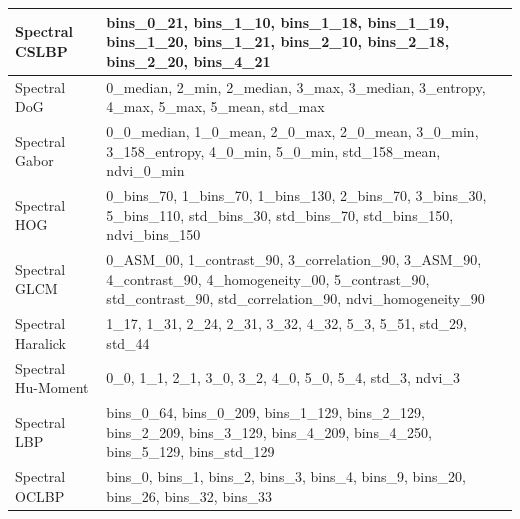 \documentclass[../thesis.tex]{subfiles}
\begin{document}
    \vfill
    \null
    
    \newpage
    
    \null
    \vfill
    \begin{table}[H]
        \begin{tabularx}{\linewidth}{|l|X|}
            \hline
            Spectral CSLBP & bins\_0\_21, bins\_1\_10, bins\_1\_18, bins\_1\_19, bins\_1\_20, bins\_1\_21, bins\_2\_10, bins\_2\_18, bins\_2\_20, bins\_4\_21 \\ \hline
            
            
            Spectral DoG & 0\_median, 2\_min, 2\_median, 3\_max, 3\_median, 3\_entropy, 4\_max, 5\_max, 5\_mean, std\_max \\ \hline
            
            Spectral Gabor & 0\_0\_median, 1\_0\_mean, 2\_0\_max, 2\_0\_mean, 3\_0\_min, 3\_158\_entropy, 4\_0\_min, 5\_0\_min, std\_158\_mean, ndvi\_0\_min \\ \hline
            
            Spectral HOG & 0\_bins\_70, 1\_bins\_70, 1\_bins\_130, 2\_bins\_70, 3\_bins\_30, 5\_bins\_110, std\_bins\_30, std\_bins\_70, std\_bins\_150, ndvi\_bins\_150 \\ \hline
            
            Spectral GLCM & 0\_ASM\_00, 1\_contrast\_90, 3\_correlation\_90, 3\_ASM\_90, 4\_contrast\_90, 4\_homogeneity\_00, 5\_contrast\_90, std\_contrast\_90, std\_correlation\_90, ndvi\_homogeneity\_90 \\ \hline
            
            Spectral Haralick & 1\_17, 1\_31, 2\_24, 2\_31, 3\_32, 4\_32, 5\_3, 5\_51, std\_29, std\_44 \\ \hline
            
            Spectral Hu-Moment & 0\_0, 1\_1, 2\_1, 3\_0, 3\_2, 4\_0, 5\_0, 5\_4, std\_3, ndvi\_3 \\ \hline
            
            Spectral LBP & bins\_0\_64, bins\_0\_209, bins\_1\_129, bins\_2\_129, bins\_2\_209, bins\_3\_129, bins\_4\_209, bins\_4\_250, bins\_5\_129, bins\_std\_129 \\ \hline
            
            Spectral OCLBP & bins\_0, bins\_1, bins\_2, bins\_3, bins\_4, bins\_9, bins\_20, bins\_26, bins\_32, bins\_33 \\ \hline
            

\end{tabularx}
\end{table}
\end{document}
